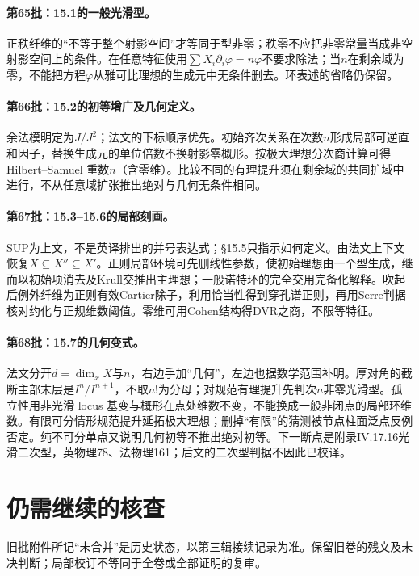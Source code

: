 \paragraph{第65批：15.1的一般光滑型。}
正秩纤维的“不等于整个射影空间”才等同于型非零；秩零不应把非零常量当成非空射影空间上的条件。在任意特征使用$\sum X_i\partial_i\varphi=n\varphi$不要求除法；当$n$在剩余域为零，不能把方程$\varphi$从雅可比理想的生成元中无条件删去。环表述的省略仍保留。
\paragraph{第66批：15.2的初等增广及几何定义。}
余法模明定为$J/J^2$；法文的下标顺序优先。初始齐次关系在次数$n$形成局部可逆直和因子，替换生成元的单位倍数不换射影零概形。按极大理想分次商计算可得 Hilbert--Samuel 重数$n$（含零维）。比较不同的有理提升须在剩余域的共同扩域中进行，不从任意域扩张推出绝对与几何无条件相同。
\paragraph{第67批：15.3--15.6的局部刻画。}
SUP为上文，不是英译排出的并号表达式；§15.5只指示如何定义。由法文上下文恢复$X\subseteq X''\subseteq X'$。正则局部环境可先删线性参数，使初始理想由一个型生成，继而以初始项消去及Krull交推出主理想；一般诺特环的完全交用完备化解释。吹起后例外纤维为正则有效Cartier除子，利用恰当性得到穿孔谱正则，再用Serre判据核对约化与正规维数阈值。零维可用Cohen结构得DVR之商，不限等特征。
\paragraph{第68批：15.7的几何变式。}
法文分开$d=\dim_xX$与$n$，右边手加“几何”，左边也据数学范围补明。厚对角的截断主部末层是$I^n/I^{n+1}$，不取$n!$为分母；对规范有理提升先判次$n$非零光滑型。孤立性用非光滑 locus 基变与概形在点处维数不变，不能换成一般非闭点的局部环维数。有限可分情形规范提升延拓极大理想；删掉“有限”的猜测被节点柱面泛点反例否定。纯不可分单点又说明几何初等不推出绝对初等。下一断点是附录IV.17.16光滑二次型，英物理78、法物理161；后文的二次型判据不因此已校译。
\section*{仍需继续的核查}
旧批附件所记“未合并”是历史状态，以第三辑接续记录为准。保留旧卷的残文及未决判断；局部校订不等同于全卷或全部证明的复审。
